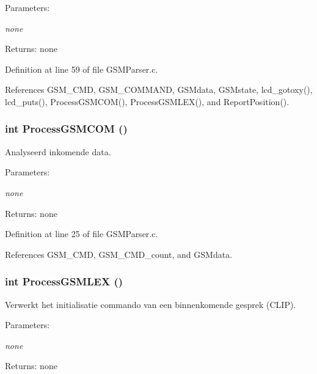 \begin{Desc}
\item[Parameters:]
\begin{description}
\item[{\em none}]\end{description}
\end{Desc}
\begin{Desc}
\item[Returns:]none \end{Desc}


Definition at line 59 of file GSMParser.c.

References GSM\_\-CMD, GSM\_\-COMMAND, GSMdata, GSMstate, lcd\_\-gotoxy(), lcd\_\-puts(), ProcessGSMCOM(), ProcessGSMLEX(), and ReportPosition().
\subsubsection{\setlength{\rightskip}{0pt plus 5cm}int ProcessGSMCOM ()}\label{_g_s_m_parser_8h_25fd6ccf5d8d48a31ad7195c2cb2fdcd}


Analyseerd inkomende data. 

\begin{Desc}
\item[Parameters:]
\begin{description}
\item[{\em none}]\end{description}
\end{Desc}
\begin{Desc}
\item[Returns:]none \end{Desc}


Definition at line 25 of file GSMParser.c.

References GSM\_\-CMD, GSM\_\-CMD\_\-count, and GSMdata.
\subsubsection{\setlength{\rightskip}{0pt plus 5cm}int ProcessGSMLEX ()}\label{_g_s_m_parser_8h_0530142dc64cdf24f8d2bee06e02a9ad}


Verwerkt het initialisatie commando van een binnenkomende gesprek (CLIP). 

\begin{Desc}
\item[Parameters:]
\begin{description}
\item[{\em none}]\end{description}
\end{Desc}
\begin{Desc}
\item[Returns:]none \end{Desc}


